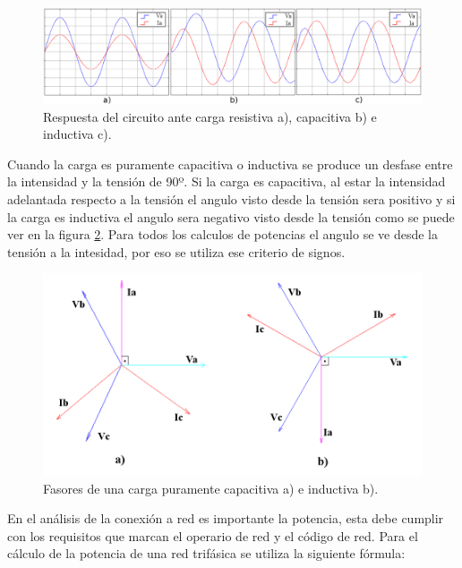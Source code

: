 \documentclass{book}
\begin{document}
\begin{figure}[h!]
\centering
\includegraphics[width=1\textwidth]{Va_IaALL.PNG}
\caption{Respuesta del circuito ante carga resistiva a), capacitiva b) e inductiva c).}
\label{Va_IaALL}
\end{figure}

Cuando la carga es puramente capacitiva o inductiva se produce un desfase entre la intensidad y la tensi\'on de 90º. Si la carga es capacitiva, al estar la intensidad adelantada respecto a la tensi\'on el angulo visto desde la tensi\'on sera positivo y si la carga es inductiva el angulo sera negativo visto desde la tensi\'on como se puede ver en la figura \ref {PhasComp}. Para todos los calculos de potencias el angulo se ve desde la tensi\'on a la intesidad, por eso se utiliza ese criterio de signos. \par

\begin{figure}[h!]
\centering
\includegraphics[width=1\textwidth]{PhasComp.PNG}
\caption{Fasores de una carga puramente capacitiva a) e inductiva b).}
\label{PhasComp}
\end{figure}

En el an\'alisis de la conexi\'on a red es importante la potencia, esta debe cumplir con los requisitos que marcan el operario de red y el c\'odigo de red. Para el c\'alculo de la potencia de una red trif\'asica se utiliza la siguiente f\'ormula:   \par
\end{document}
